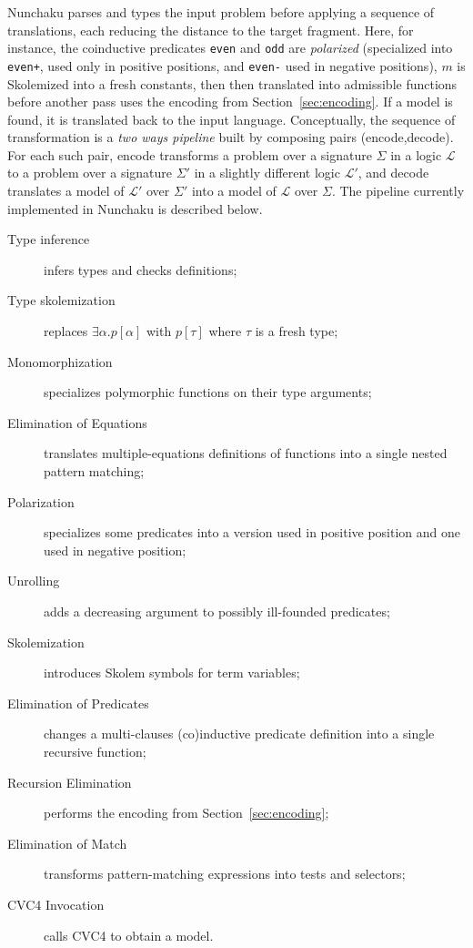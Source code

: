 Nunchaku parses and types the input problem before applying a sequence
of translations, each reducing the distance to the target fragment. Here,
for instance, the coinductive predicates
\verb!even! and \verb!odd! are \emph{polarized} (specialized into
\verb!even+!, used only in positive positions, and \verb!even-! used in negative
positions),
$m$ is Skolemized into a fresh constants,
then then translated into admissible functions
before another pass uses the encoding from Section~\ref{sec:encoding}.
If a model is found, it is translated back to the input language.
Conceptually, the sequence of transformation is a \emph{two ways pipeline}
built by composing pairs \textsf{(encode,decode)}.
For each such pair, \textsf{encode}
transforms a problem over a signature $\Sigma$ in a logic
$\mathcal{L}$ to a problem over a signature $\Sigma'$ in a slightly different
logic $\mathcal{L}'$, and \textsf{decode} translates a model of $\mathcal{L'}$
over $\Sigma'$ into a model of $\mathcal{L}$ over $\Sigma$. The pipeline
currently implemented in Nunchaku is described below.

\begin{description}
  \item[Type inference] infers types and checks definitions;
  \item[Type skolemization]
    replaces $\exists \alpha. p[\alpha]$
      with $p[\tau]$ where $\tau$ is a fresh type;
  \item[Monomorphization]
    specializes polymorphic functions on their type arguments;
  \item[Elimination of Equations]
    translates multiple-equations definitions of functions into
      a single nested pattern matching;
  \item[Polarization]
    specializes some predicates into a version used in positive position
      and one used in negative position;
  \item[Unrolling]
    adds a decreasing argument to possibly ill-founded predicates;
  \item[Skolemization]
    introduces Skolem symbols for term variables;
  \item[Elimination of Predicates]
    changes a multi-clauses (co)inductive predicate definition
      into a single recursive function;
  \item[Recursion Elimination]
    performs the encoding from Section~\ref{sec:encoding};
  \item[Elimination of Match]
    transforms pattern-matching expressions into tests and selectors;
  \item[CVC4 Invocation] calls CVC4 to obtain a model.
\end{description}

